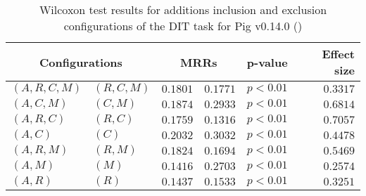 
\begin{table}
\begin{spacing}{1.2}
\centering
\caption{Wilcoxon test results for additions inclusion and exclusion configurations of the DIT task for Pig v0.14.0 (\ctwo)}
\label{table:versus-wilcox-pig-dit-additions}
\begin{tabular}{ll|rr|rr}
\toprule
      \multicolumn{2}{c|}{Configurations} &                \multicolumn{2}{c|}{MRRs} &             p-value & Effect size \\
\midrule
 $(A,R,C,M)$ &  $(R,C,M)$ &  $\bm{0.1801}$ &       $0.1771$ & $p<0.01$ &    $0.3317$ \\
   $(A,C,M)$ &    $(C,M)$ &       $0.1874$ &  $\bm{0.2933}$ & $p<0.01$ &    $0.6814$ \\
   $(A,R,C)$ &    $(R,C)$ &  $\bm{0.1759}$ &       $0.1316$ & $p<0.01$ &    $0.7057$ \\
     $(A,C)$ &      $(C)$ &       $0.2032$ &  $\bm{0.3032}$ & $p<0.01$ &    $0.4478$ \\
   $(A,R,M)$ &    $(R,M)$ &  $\bm{0.1824}$ &       $0.1694$ & $p<0.01$ &    $0.5469$ \\
     $(A,M)$ &      $(M)$ &       $0.1416$ &  $\bm{0.2703}$ & $p<0.01$ &    $0.2574$ \\
     $(A,R)$ &      $(R)$ &       $0.1437$ &  $\bm{0.1533}$ & $p<0.01$ &    $0.3251$ \\
\bottomrule
\end{tabular}

\end{spacing}
\end{table}

